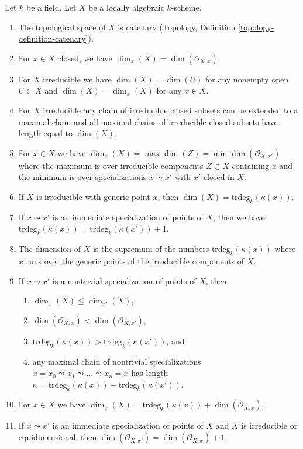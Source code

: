 \begin{lemma}
\label{lemma-dimension-locally-algebraic}
Let $k$ be a field. Let $X$ be a locally algebraic $k$-scheme.
\begin{enumerate}
\item
\label{item-catenary}
The topological space of $X$ is catenary
(Topology, Definition \ref{topology-definition-catenary}).
\item
\label{item-dimension-at-closed-point}
For $x \in X$ closed, we have $\dim_x(X) = \dim(\mathcal{O}_{X, x})$.
\item
\label{item-dimension-irreducible}
For $X$ irreducible we have $\dim(X) = \dim(U)$ for any
nonempty open $U \subset X$ and $\dim(X) = \dim_x(X)$
for any $x \in X$.
\item
\label{item-irreducible-maximal-chains}
For $X$ irreducible any chain of irreducible closed subsets can be
extended to a maximal chain and all maximal chains of irreducible
closed subsets have length equal to $\dim(X)$.
\item
\label{item-dimension-irreducibles-passing-through}
For $x \in X$ we have
$\dim_x(X) = \max \dim(Z) = \min \dim(\mathcal{O}_{X, x'})$
where the maximum is over irreducible components
$Z \subset X$ containing $x$ and the minimum is over
specializations $x \leadsto x'$ with $x'$ closed in $X$.
\item
\label{item-dimension-irreducible-trdeg}
If $X$ is irreducible with generic point $x$, then
$\dim(X) = \text{trdeg}_k(\kappa(x))$.
\item
\label{item-immediate-specialization}
If $x \leadsto x'$ is an immediate specialization
of points of $X$, then we have
$\text{trdeg}_k(\kappa(x)) = \text{trdeg}_k(\kappa(x')) + 1$.
\item
\label{item-dimension-sup-trdeg}
The dimension of $X$ is the supremum of the numbers
$\text{trdeg}_k(\kappa(x))$ where $x$ runs over the
generic points of the irreducible components of $X$.
\item
\label{item-specialization}
If $x \leadsto x'$ is a nontrivial specialization of points of $X$, then
\begin{enumerate}
\item $\dim_x(X) \leq \dim_{x'}(X)$,
\item $\dim(\mathcal{O}_{X, x}) < \dim(\mathcal{O}_{X, x'})$,
\item $\text{trdeg}_k(\kappa(x)) > \text{trdeg}_k(\kappa(x'))$, and
\item any maximal chain of nontrivial specializations
$x = x_0 \leadsto x_1 \leadsto \ldots \leadsto x_n = x$ has
length $n = \text{trdeg}_k(\kappa(x)) - \text{trdeg}_k(\kappa(x'))$.
\end{enumerate}
\item
\label{item-dimension-formula}
For $x \in X$ we have
$\dim_x(X) = \text{trdeg}_k(\kappa(x)) + \dim(\mathcal{O}_{X, x})$.
\item
\label{item-immediate-specialization-local-ring}
If $x \leadsto x'$ is an immediate specialization
of points of $X$ and $X$ is irreducible or equidimensional, then
$\dim(\mathcal{O}_{X, x'}) = \dim(\mathcal{O}_{X, x}) + 1$.
\end{enumerate}
\end{lemma}

